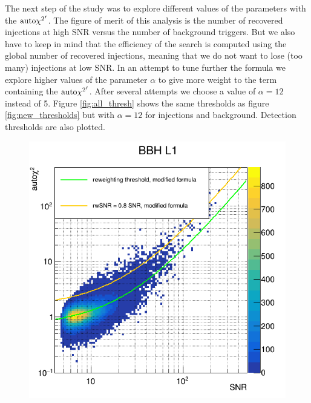 The next step of the study was to explore different values of the parameters with the $\textrm{auto$\chi^2$}'$.
The figure of merit of this analysis is the number of recovered injections at high SNR versus the number of background triggers.
But we also have to keep in mind that the efficiency of the search is computed using the global number of recovered injections, meaning that we do not want to lose (too many) injections at low SNR.
In an attempt to tune further the formula we explore higher values of the parameter $\alpha$ to give more weight to the term containing the $\textrm{auto$\chi^2$}'$.
After several attempts we choose a value of $\alpha = 12$ instead of 5.
Figure \ref{fig:all_thresh} shows the same thresholds as figure \ref{fig:new_thresholds} but with $\alpha = 12$ for injections and background.
Detection thresholds are also plotted.
\begin{figure}[ht]
  \centering
  \begin{minipage}{0.45\linewidth}
    \centering
    \includegraphics[width=\textwidth]{sectionImprovement/rwSNR/cSnrAchi2_new_L1.png}
  \end{minipage}
  \hfill
  \begin{minipage}{0.45\linewidth}
    \centering

\end{minipage}
\end{figure}

